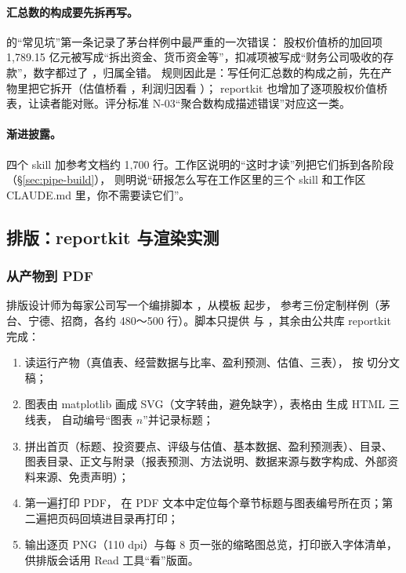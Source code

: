 \paragraph{汇总数的构成要先拆再写。} 的“常见坑”第一条记录了茅台样例中最严重的一次错误：
股权价值桥的加回项 1,789.15 亿元被写成“拆出资金、货币资金等”，扣减项被写成“财务公司吸收的存款”，数字都过了 ，归属全错。
规则因此是：写任何汇总数的构成之前，先在产物里把它拆开（估值桥看 ，利润归因看 ）；
reportkit 也增加了逐项股权价值桥表，让读者能对账。评分标准 N-03“聚合数构成描述错误”对应这一类。

\paragraph{渐进披露。}四个 skill 加参考文档约 1,700 行。工作区说明的“这时才读”列把它们拆到各阶段（\S\ref{sec:pipe-build}），
 则明说“研报怎么写在工作区里的三个 skill 和工作区 CLAUDE.md 里，你不需要读它们”。

\subsection{排版：reportkit 与渲染实测}
\label{sec:pipe-reportkit}

\subsubsection{从产物到 PDF}

排版设计师为每家公司写一个编排脚本 ，从模板  起步，
参考三份定制样例（茅台、宁德、招商，各约 480～500 行）。脚本只提供  与 ，其余由公共库 reportkit 完成：

\begin{enumerate}
  \item {} 读运行产物（真值表、经营数据与比率、盈利预测、估值、三表）， 按  切分文稿；
  \item 图表由 matplotlib 画成 SVG（文字转曲，避免缺字），表格由  生成 HTML 三线表， 自动编号“图表 $n$”并记录标题；
  \item {} 拼出首页（标题、投资要点、评级与估值、基本数据、盈利预测表）、目录、图表目录、正文与附录（报表预测、方法说明、数据来源与数字构成、外部资料来源、免责声明）；
  \item 第一遍打印 PDF， 在 PDF 文本中定位每个章节标题与图表编号所在页；第二遍把页码回填进目录再打印；
  \item {} 输出逐页 PNG（110 dpi）与每 8 页一张的缩略图总览，打印嵌入字体清单，供排版会话用 Read 工具“看”版面。
\end{enumerate}

